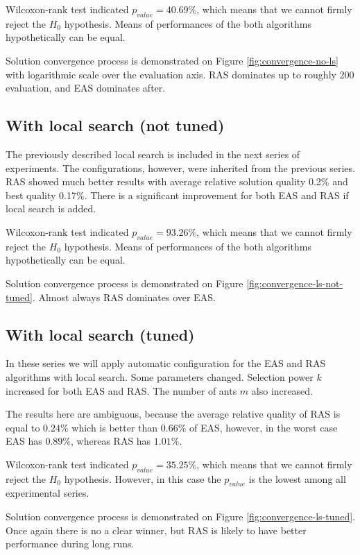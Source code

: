 \documentclass[12pt]{article}
\begin{document}
Wilcoxon-rank test indicated $p_{value} = 40.69\%$, which means that we cannot firmly reject the $H_0$ hypothesis. Means of performances of the both algorithms hypothetically can be equal.

Solution convergence process is demonstrated on Figure \ref{fig:convergence-no-ls} with logarithmic scale over the evaluation axis. RAS dominates up to roughly 200 evaluation, and EAS dominates after.

\subsection{With local search (not tuned)}

The previously described local search is included in the next series of experiments. The configurations, however, were inherited from the previous series. RAS showed much better results with average relative solution quality 0.2\% and best quality 0.17\%. There is a significant improvement for both EAS and RAS if local search is added.

Wilcoxon-rank test indicated $p_{value} = 93.26\%$, which means that we cannot firmly reject the $H_0$ hypothesis. Means of performances of the both algorithms hypothetically can be equal.

Solution convergence process is demonstrated on Figure \ref{fig:convergence-ls-not-tuned}. Almost always RAS dominates over EAS.

\subsection{With local search (tuned)}

In these series we will apply automatic configuration for the EAS and RAS algorithms with local search. Some parameters changed. Selection power $k$ increased for both EAS and RAS. The number of ants $m$ also increased.

The results here are ambiguous, because the average relative quality of RAS is equal to $0.24\%$ which is better than $0.66\%$ of EAS, however, in the worst case EAS has $0.89\%$, whereas RAS has $1.01\%$.

Wilcoxon-rank test indicated $p_{value} = 35.25\%$, which means that we cannot firmly reject the $H_0$ hypothesis. However, in this case the $p_{value}$ is the lowest among all experimental series.

Solution convergence process is demonstrated on Figure \ref{fig:convergence-ls-tuned}. Once again there is no a clear winner, but RAS is likely to have better performance during long runs.
\end{document}
